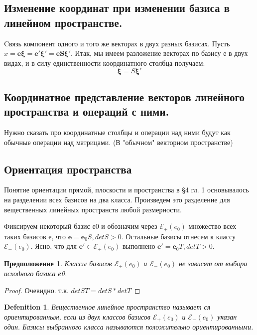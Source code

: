 \documentclass[11pt; a4paper]{report}
\theoremstyle{plain} %
\newtheorem{sug}{Предположение}[section]
\theoremstyle{defenition}
\newtheorem{glob_def}{Defenition}
\theoremstyle{remark}
\begin{document}
\subsection{Изменение координат при изменении базиса в линейном пространстве.}
Cвязь компонент одного и того же векторах в двух разных базисах. Пусть $x = \boldsymbol{e\xi} = 
 \boldsymbol{e'\xi'} = \boldsymbol{eS\xi'}$. Итак, мы имеем разложение векторах по базису е в двух видах, и в силу единственности координатного столбца получаем: 
 \begin{equation}\label{eq6.4}
  \boldsymbol{\xi} = S\boldsymbol{\xi'}
 \end{equation}
 
 
\subsection{Координатное представление векторов линейного пространства и операций с ними.}
Нужно сказать про координатные столбцы и операции над ними будут как обычные операции над матрицами.
(В "обычном" векторном пространстве)

\subsection{Ориентация пространства}
Понятие ориентации прямой, плоскости и пространства в §4 гл. 1 основывалось на разделении всех базисов на два класса. Произведем это разделение для вещественных линейных пространств любой размерности.

Фиксируем некоторый базис е0 и обозначим через $\mathscr{E}_+(e_0)$ мно­жество всех таких базисов е, 
что $\boldsymbol{e} = \boldsymbol{e}_0 S, detS>0$. Остальные базисы отнесем к классу $\mathscr{E}_-(e_0)$. 
Ясно, что для $\boldsymbol{e'}  \in \mathscr{E}_+(e_0)$ выполне­но $\boldsymbol{e'} = \boldsymbol{e}_0 T, detT>0$.

\begin{sug}\label{sug6.12}
Классы базисов $\mathscr{E}_+(e_0)$ и  $\mathscr{E}_-(e_0)$ не зависят от выбора исходного базиса е0.
\end{sug}
\begin{proof}
Очевидно. т.к. $detST = detS *detT$
\end{proof}

\begin{glob_def}
Вещественное линейное пространство называет­ ся ориентированным, если из двух классов базисов 
$\mathscr{E}_+(e_0)$ и  $\mathscr{E}_-(e_0)$ указан один. Базисы выбранного класса называются положительно
ориенти­рованными.
\end{glob_def}
\end{document}

